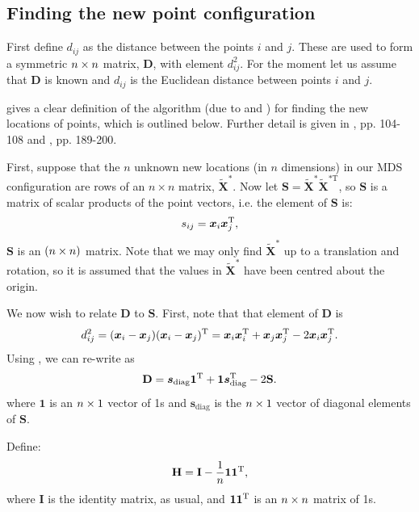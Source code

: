 \subsection{Finding the new point configuration}

First define $d_{ij}$ as the distance between the points $i$ and $j$. These are used to form a symmetric $n \times n$ matrix, $\mathbf{D}$, with \ijth element $d^2_{ij}$. For the moment let us assume that $\mathbf{D}$ is known and $d_{ij}$ is the Euclidean distance between points $i$ and $j$. 

\cite{diaconis08} gives a clear definition of the algorithm (due to \cite{schoenberg35} and \cite{torgerson}) for finding the new locations of points, which is outlined below. Further detail is given in \cite{principlesofMA}, pp. 104-108 and \cite{chatfieldcollins}, pp. 189-200.

First, suppose that the $n$ unknown new locations (in $n$ dimensions) in our MDS configuration are rows of an $n \times n$ matrix, $\tilde{\mathbf{X}}^*$. Now let $\mathbf{S}=\tilde{\mathbf{X}}^{*} \tilde{\mathbf{X}}^{*\text{T}} $, so $\mathbf{S}$ is a matrix of scalar products of the point vectors, i.e. the \ijth element of $\mathbf{S}$ is:
\begin{equation}
s_{ij} = \bm{x}_i\bm{x}_j^{\text{T}},
\label{selem}
\end{equation}
$\mathbf{S}$ is an $(n\times n)$ matrix. Note that we may only find $\tilde{\mathbf{X}}^*$ up to a translation and rotation, so it is assumed that the values in $\tilde{\mathbf{X}}^*$ have been centred about the origin.

We now wish to relate $\mathbf{D}$ to $\mathbf{S}$. First, note that that \ijth element of $\mathbf{D}$ is 
\begin{equation}
d_{ij}^2 = (\bm{x}_i-\bm{x}_j)(\bm{x}_i-\bm{x}_j)^{\text{T}} = \bm{x}_i\bm{x}_i^{\text{T}} + \bm{x}_j\bm{x}_j^{\text{T}}  -2 \bm{x}_i\bm{x}_j^{\text{T}}.
\label{dij}
\end{equation}
Using , we can re-write  as
\begin{equation}
\mathbf{D}=\bm{s}_\text{diag}\bm{1}^{\text{T}} + \bm{1}\bm{s}_\text{diag}^{\text{T}} -2\mathbf{S}.
\label{dijmat}
\end{equation}
where $\bm{1}$ is an $n \times 1$ vector of 1s and $\bm{s}_\text{diag}$ is the $n \times 1$ vector of diagonal elements of $\mathbf{S}$.

Define:
\begin{equation}
\mathbf{H} = \mathbf{I}-\frac{1}{n}\bm{1}\bm{1}^{\text{T}},
\end{equation}
where $\mathbf{I}$ is the identity matrix, as usual, and $\bm{1}\bm{1}^{\text{T}}$ is an $n \times n$ matrix of 1s.

